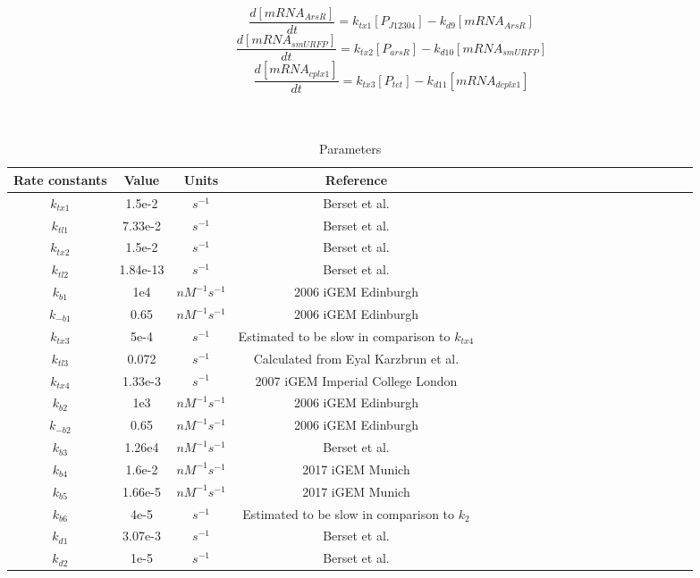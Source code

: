 \begin{equation}
	\frac{d[mRNA_{ArsR}]}{dt}=k_{tx1}[P_{J12304}]-k_{d9}[mRNA_{ArsR}] \tag{13}
\end{equation}
\begin{equation}
	\frac{d[mRNA_{smURFP}]}{dt}=k_{tx2}[P_{arsR}]-k_{d10}[mRNA_{smURFP}] \tag{14}
\end{equation}
\begin{equation}
	\frac{d[mRNA_{cplx1}]}{dt}=k_{tx3}[P_{tet}]-k_{d11}[mRNA_{dcplx1}] \tag{15}
\end{equation}
\\\\
\begin{table}[htbp]
	\centering
	\caption{\label {tab:test} Parameters}
	\begin{tabular}{ccccccccccccccccccccc}
		\toprule
		Rate constants & Value& Units & Reference \\
		\midrule
		$k_{tx1}$ & 1.5e-2&$s^{-1} $& Berset et al.\cite{berset2017mechanistic} \\
		$k_{tl1}$ & 7.33e-2 &$s^{-1} $& Berset et al.\\
		$k_{tx2}$ & 1.5e-2 & $s^{-1}$ & Berset et al.\\
		$k_{tl2} $&1.84e-13&$s^{-1}$& Berset et al.\\
		$k_{b1} $& 1e4   & $nM^{-1}s^{-1}$ &2006 iGEM Edinburgh  \\
		$k_{-b1}$ & 0.65    & $nM^{-1}s^{-1}$ &2006 iGEM Edinburgh   \\
		$k_{tx3}$& 5e-4 &$s^{-1}$&Estimated to be slow in comparison to $k_{tx4} $\\
		$k_{tl3} $& 0.072   & $s^{-1}$ & Calculated from Eyal Karzbrun et al.  \\
		$k_{tx4} $& 1.33e-3 &$s^{-1}$&2007 iGEM Imperial College London \\
		$k_{b2} $& 1e3   & $nM^{-1}s^{-1}$ &2006 iGEM Edinburgh  \\
		$k_{-b2} $& 0.65    & $nM^{-1}s^{-1}$ &2006 iGEM Edinburgh   \\
		$k_{b3}  $&1.26e4  &$nM^{-1}s^{-1}$ &  Berset et al. \\
		$k_{b4}$&1.6e-2& $nM^{-1}s^{-1}$& 2017 iGEM Munich\\
		$k_{b5} $&1.66e-5&$nM^{-1}s^{-1}$&  2017 iGEM Munich\\ 
		$k_{b6}$&4e-5&$s^{-1} $& Estimated to be slow in comparison to $k_{2}$\\
		$k_{d1} $& 3.07e-3&$s^{-1} $ & Berset et al.\\
		$k_{d2}$&1e-5&$s^{-1} $ & Berset et al.\\

\end{tabular}
\end{table}
